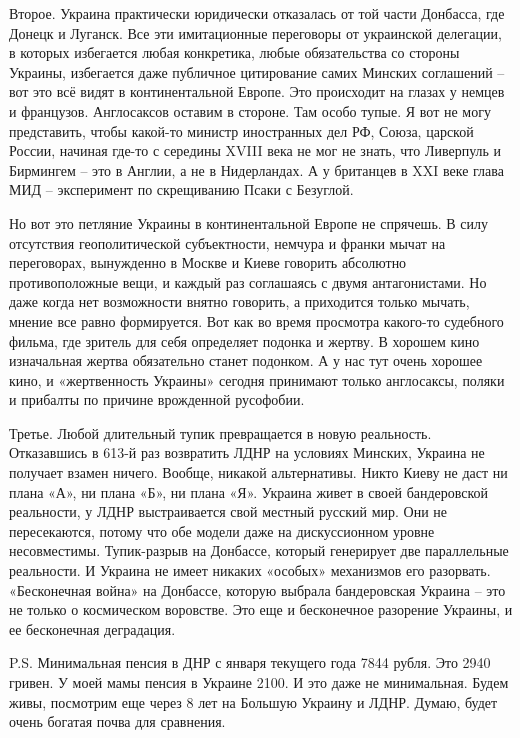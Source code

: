 Второе. Украина практически юридически отказалась от той части Донбасса, где
Донецк и Луганск. Все эти имитационные переговоры от украинской делегации, в
которых избегается любая конкретика, любые обязательства со стороны Украины,
избегается даже публичное цитирование самих Минских соглашений – вот это всё
видят в континентальной Европе. Это происходит на глазах у немцев и французов.
Англосаксов оставим в стороне. Там особо тупые. Я вот не могу представить,
чтобы какой-то министр иностранных дел РФ, Союза, царской России, начиная
где-то с середины XVIII века не мог не знать, что Ливерпуль и Бирмингем – это в
Англии, а не в Нидерландах. А у британцев в XXI веке глава МИД – эксперимент по
скрещиванию Псаки с Безуглой.

Но вот это петляние Украины в континентальной Европе не спрячешь. В силу
отсутствия геополитической субъектности, немчура и франки мычат на переговорах,
вынужденно в Москве и Киеве говорить абсолютно противоположные вещи, и каждый
раз соглашаясь с двумя антагонистами. Но даже когда нет возможности внятно
говорить, а приходится только мычать, мнение все равно формируется. Вот как во
время просмотра какого-то судебного фильма, где зритель для себя определяет
подонка и жертву. В хорошем кино изначальная жертва обязательно станет
подонком. А у нас тут очень хорошее кино, и «жертвенность Украины» сегодня
принимают только англосаксы, поляки и прибалты по причине врожденной русофобии.

Третье. Любой длительный тупик превращается в новую реальность. Отказавшись в
613-й раз возвратить ЛДНР на условиях Минских, Украина не получает взамен
ничего. Вообще, никакой альтернативы. Никто Киеву не даст ни плана «А», ни
плана «Б», ни плана «Я». Украина живет в своей бандеровской реальности, у ЛДНР
выстраивается свой местный русский мир. Они не пересекаются, потому что обе
модели даже на дискуссионном уровне несовместимы. Тупик-разрыв на Донбассе,
который генерирует две параллельные реальности. И Украина не имеет никаких
«особых» механизмов его разорвать. «Бесконечная война» на Донбассе, которую
выбрала бандеровская Украина – это не только о космическом воровстве. Это еще и
бесконечное разорение Украины, и ее бесконечная деградация.

P.S. Минимальная пенсия в ДНР с января текущего года 7844 рубля. Это 2940
гривен. У моей мамы пенсия в Украине 2100. И это даже не минимальная. Будем
живы, посмотрим еще через 8 лет на Большую Украину и ЛДНР. Думаю, будет очень
богатая почва для сравнения.
